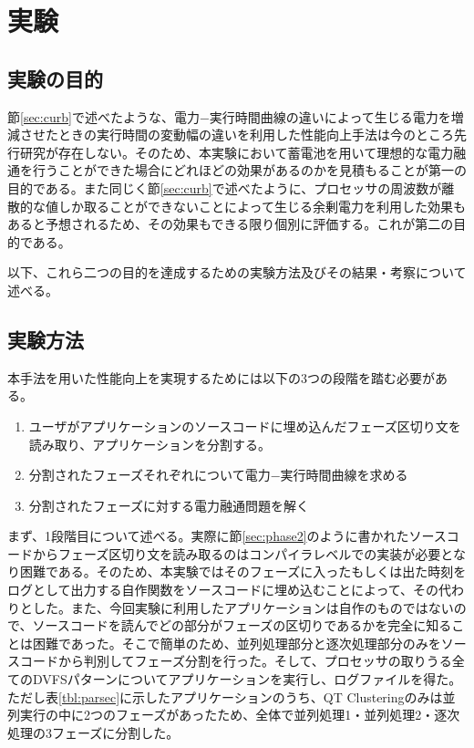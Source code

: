\chapter{実験}
\label{chap:experiment}


\section{実験の目的}
\label{sec:purpose}

節\ref{sec:curb}で述べたような、電力−実行時間曲線の違いによって生じる電力を増減させたときの実行時間の変動幅の違いを利用した性能向上手法は今のところ先行研究が存在しない。そのため、本実験において蓄電池を用いて理想的な電力融通を行うことができた場合にどれほどの効果があるのかを見積もることが第一の目的である。また同じく節\ref{sec:curb}で述べたように、プロセッサの周波数が離散的な値しか取ることができないことによって生じる余剰電力を利用した効果もあると予想されるため、その効果もできる限り個別に評価する。これが第二の目的である。

以下、これら二つの目的を達成するための実験方法及びその結果・考察について述べる。


\section{実験方法}
\label{sec:method}

本手法を用いた性能向上を実現するためには以下の3つの段階を踏む必要がある。

\begin{enumerate}
\item ユーザがアプリケーションのソースコードに埋め込んだフェーズ区切り文を読み取り、アプリケーションを分割する。
\item 分割されたフェーズそれぞれについて電力−実行時間曲線を求める
\item 分割されたフェーズに対する電力融通問題を解く
\end{enumerate}

まず、1段階目について述べる。実際に節\ref{sec:phase2}のように書かれたソースコードからフェーズ区切り文を読み取るのはコンパイラレベルでの実装が必要となり困難である。そのため、本実験ではそのフェーズに入ったもしくは出た時刻をログとして出力する自作関数をソースコードに埋め込むことによって、その代わりとした。また、今回実験に利用したアプリケーションは自作のものではないので、ソースコードを読んでどの部分がフェーズの区切りであるかを完全に知ることは困難であった。そこで簡単のため、並列処理部分と逐次処理部分のみをソースコードから判別してフェーズ分割を行った。そして、プロセッサの取りうる全てのDVFSパターンについてアプリケーションを実行し、ログファイルを得た。ただし表\ref{tbl:parsec}に示したアプリケーションのうち、QT Clusteringのみは並列実行の中に2つのフェーズがあったため、全体で並列処理1・並列処理2・逐次処理の3フェーズに分割した。

